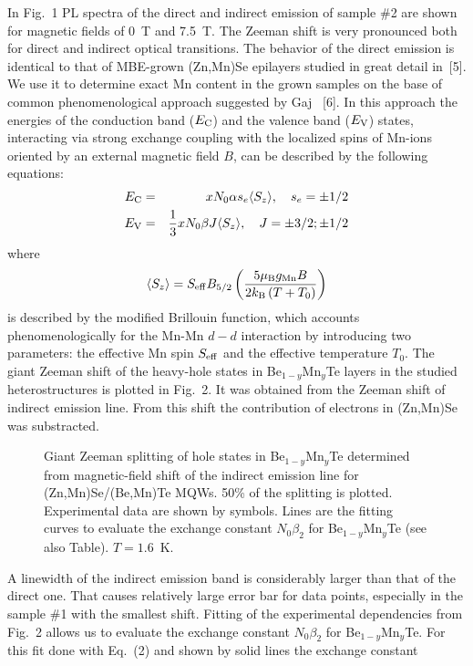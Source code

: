 \documentclass[a4paper,draft]{book}
\begin{document}
In Fig.~1 PL spectra of the direct and indirect emission of sample {\#}2 are
shown for magnetic fields of 0~T and 7.5~T.
The Zeeman shift is very pronounced both for direct and indirect optical transitions.
The behavior of the direct emission is identical to that of MBE-grown (Zn,Mn)Se epilayers
studied in great detail in~[5].
We use it to determine exact Mn content
in the grown samples on the base of common phenomenological approach
suggested by Gaj \etal~[6].
In this approach the energies of the conduction
band ($E_{\rm C}$) and the valence band ($E_{\rm V}$) states, interacting via strong
exchange coupling with the localized spins of Mn-ions oriented by an
external magnetic field $B$, can be described by the following equations:
\begin{eqnarray}
E_{\rm C}   &=&
xN_0\alpha s_e \langle {S_z } \rangle,
\quad s_e = \pm 1/2
\\
E_{\rm V}   &=&
\frac{1}{3}xN_0 \beta J \langle {S_z } \rangle,
\quad J=\pm 3/2; \pm 1/2
\end{eqnarray}
where
$$
\langle {S_z } \rangle = S_{\rm eff}
B_{5/2}\left( {\frac{5\mu_{\rm B} g_{\rm Mn} B}{2k_{\rm B} \left(T + T_0 \right)}} \right)
$$
is described by the modified Brillouin function, which
accounts phenomenologically for the Mn-Mn $d{-}d$ interaction by
introducing two parameters: the effective Mn spin $S_{\rm eff} $ and
the effective temperature $T_0 $.
The giant Zeeman shift of the heavy-hole states in Be$_{1-y}$Mn$_{y}$Te layers
in the studied heterostructures is plotted in Fig.~2.
It was obtained from the Zeeman shift of indirect emission line.
From this shift the contribution of electrons in (Zn,Mn)Se
was substracted.
\begin{figure}[b]
\leavevmode {}
\caption{Giant Zeeman splitting of hole states in Be$_{1 -y}$Mn$_{y}$Te
determined from magnetic-field shift of the indirect
emission line for (Zn,Mn)Se/(Be,Mn)Te MQWs. 50{\%} of the
splitting is plotted. Experimental data are shown by symbols.
Lines are the fitting curves to evaluate the exchange constant
$N_0 \beta _2 $ for Be$_{1 - y}$Mn$_{y}$Te (see also Table).
$T=1.6$~K.}
\end{figure}
A linewidth of the indirect emission band is
considerably larger than that of the direct one.
That causes relatively large error bar for data points, especially in the
sample {\#}1 with the smallest shift.
Fitting of the experimental dependencies from Fig.~2 allows us to evaluate the exchange
constant $N_0 \beta _2 $ for Be$_{1-y}$Mn$_{y}$Te.
For this fit done with Eq.~(2) and shown by solid lines the exchange constant
\end{document}

